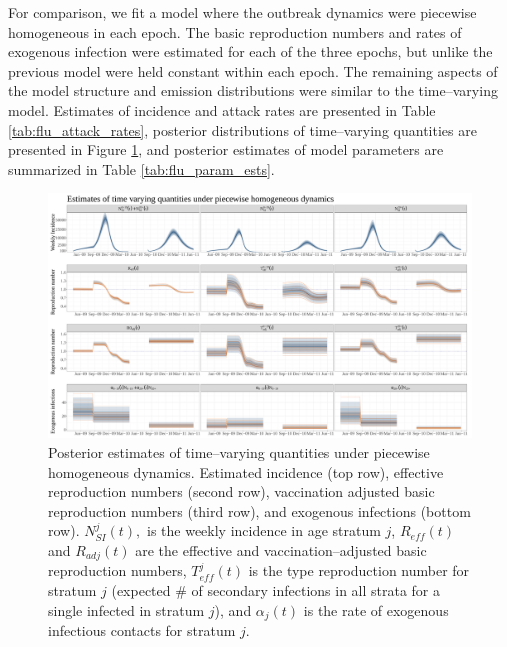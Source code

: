 For comparison, we fit a model where the outbreak dynamics were piecewise homogeneous in each epoch. The basic reproduction numbers and rates of exogenous infection were estimated for each of the three epochs, but unlike the previous model were held constant within each epoch. The remaining aspects of the model structure and emission distributions were similar to the time--varying model. Estimates of incidence and attack rates are presented in Table \ref{tab:flu_attack_rates}, posterior distributions of time--varying quantities are presented in Figure \ref{fig:fluconstodetimevaryingplots}, and posterior estimates of model parameters are summarized in Table \ref{tab:flu_param_ests}. 

\begin{figure}
	\centering
	\includegraphics[width=0.95\linewidth]{figures/flu_const_ode_timevarying_plots}
	\caption{Posterior estimates of time--varying quantities under piecewise homogeneous dynamics. Estimated incidence (top row), effective reproduction numbers (second row), vaccination adjusted basic reproduction numbers (third row), and exogenous infections (bottom row). $ N_{SI}^j(t), $ is the weekly incidence in age stratum $ j $, $ R_{eff}(t) $ and $ R_{adj}(t) $ are the effective and vaccination--adjusted basic reproduction numbers, $ T_{eff}^j(t) $ is the type reproduction number for stratum $ j $ (expected \# of secondary infections in all strata for a single infected in stratum $ j $), and $ \alpha_j(t) $ is the rate of exogenous infectious contacts for stratum $ j $.}
	\label{fig:fluconstodetimevaryingplots}
\end{figure}

